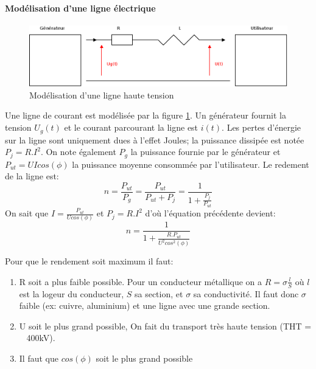 \documentclass[10pt,a4paper]{article}
\begin{document}
\paragraph{Modélisation d'une ligne électrique}
\begin{figure}
\centering
\includegraphics[scale=0.20]{modelisation_ligne}
\caption{Modélisation d'une ligne haute tension}
\label{fig:model_ligne}
\end{figure}
Une ligne de courant est modélisée par la figure \ref{fig:model_ligne}. Un générateur fournit la tension $U_{g}(t)$ et le courant parcourant la ligne est $i(t)$. Les pertes d'énergie sur la ligne sont uniquement dues à l'effet Joules; la puissance dissipée est notée $P_{j} = R.I^{2}$. On note également $P_{g}$ la puissance fournie par le générateur et $P_{ut} = UIcos(\phi)$ la puissance moyenne consommée par l'utilisateur. Le redement de la ligne est:
\begin{equation}
n = \frac{P_{ut}}{P_{g}} = \frac{P_{ut}}{P_{ut} + P_{j}} = \frac{1}{1 + \frac{P_{j}}{P_{ut}}}
\end{equation}
On sait que $I = \frac{P_{ut}}{U cos(\phi)}$ et $P_{j} = R.I^{2}$ d'où l'équation précédente devient:
\begin{equation}
n = \frac{1}{1 + \frac{R.P_{ut}}{U^{2}cos^{2}(\phi)}}
\end{equation}

Pour que le rendement soit maximum il faut:
\begin{enumerate}
\item R soit a plus faible possible. Pour un conducteur métallique on a $R = \sigma \frac{l}{S}$ où $l$ est la logeur du conducteur, $S$ sa section, et $\sigma$ sa conductivité. Il faut donc $\sigma$ faible (ex: cuivre, aluminium) et une ligne avec une grande section.
\item U soit le plus grand possible, On fait du transport très haute tension (THT = ~ 400kV).
\item Il faut que $cos(\phi)$ soit le plus grand possible
\end{enumerate}
\end{document}
